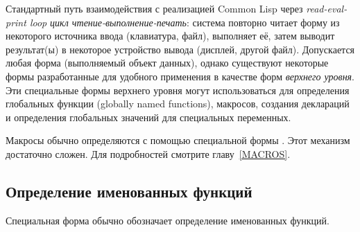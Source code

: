 Стандартный путь взаимодействия с реализацией Common Lisp через
\emph{read-eval-print loop} \emph{цикл чтение-выполнение-печать}: система
повторно читает форму из некоторого источника ввода (клавиатура, файл),
выполняет её, затем выводит результат(ы) в некоторое устройство вывода (дисплей,
другой файл). Допускается любая форма (выполняемый объект данных), однако
существуют некоторые формы разработанные для удобного применения в качестве форм 
\emph{верхнего уровня}.
Эти специальные формы верхнего уровня могут использоваться для определения
глобальных функции (globally named functions), макросов, создания деклараций и
определения глобальных значений для специальных переменных.

Макросы обычно определяются с помощью специальной формы .
Этот механизм достаточно сложен. Для подробностей смотрите главу~\ref{MACROS}.

\subsection{Определение именованных функций}

Специальная форма  обычно обозначает определение именованных функций.

